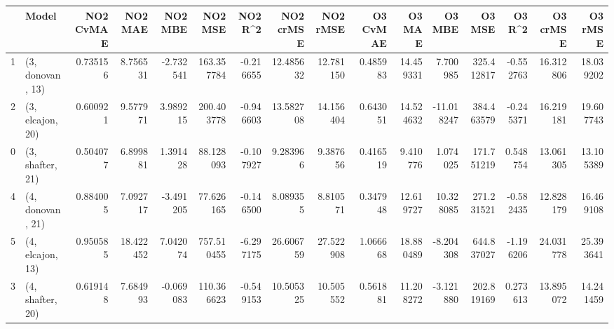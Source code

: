 \begin{tabular}{llrrrrrrrrrrrrrr}
\toprule
{} &             Model &  NO2 CvMAE &    NO2 MAE &   NO2 MBE &     NO2 MSE &   NO2 R\textasciicircum2 &  NO2 crMSE &   NO2 rMSE &  O3 CvMAE &     O3 MAE &     O3 MBE &      O3 MSE &    O3 R\textasciicircum2 &   O3 crMSE &    O3 rMSE \\
\midrule
1 &  (3, donovan, 13) &   0.735156 &   8.756531 & -2.732541 &  163.357784 & -0.216655 &  12.485632 &  12.781150 &  0.485983 &  14.459331 &   7.700985 &  325.412817 & -0.552763 &  16.312806 &  18.039202 \\
2 &  (3, elcajon, 20) &   0.600921 &   9.577971 &  3.989215 &  200.403778 & -0.946603 &  13.582708 &  14.156404 &  0.643051 &  14.524632 & -11.018247 &  384.463579 & -0.245371 &  16.219181 &  19.607743 \\
0 &  (3, shafter, 21) &   0.504077 &   6.899881 &  1.391428 &   88.128093 & -0.107927 &   9.283966 &   9.387656 &  0.416519 &   9.410776 &   1.074025 &  171.751219 &  0.548754 &  13.061305 &  13.105389 \\
4 &  (4, donovan, 21) &   0.884005 &   7.092717 & -3.491205 &   77.626165 & -0.146500 &   8.089355 &   8.810571 &  0.347948 &  12.619727 &  10.328085 &  271.231521 & -0.582435 &  12.828179 &  16.469108 \\
5 &  (4, elcajon, 13) &   0.950585 &  18.422452 &  7.042074 &  757.510455 & -6.297175 &  26.606759 &  27.522908 &  1.066668 &  18.880489 &  -8.204308 &  644.837027 & -1.196206 &  24.031778 &  25.393641 \\
3 &  (4, shafter, 20) &   0.619148 &   7.684993 & -0.069083 &  110.366623 & -0.549153 &  10.505325 &  10.505552 &  0.561881 &  11.208272 &  -3.121880 &  202.819169 &  0.273613 &  13.895072 &  14.241459 \\
\bottomrule
\end{tabular}
